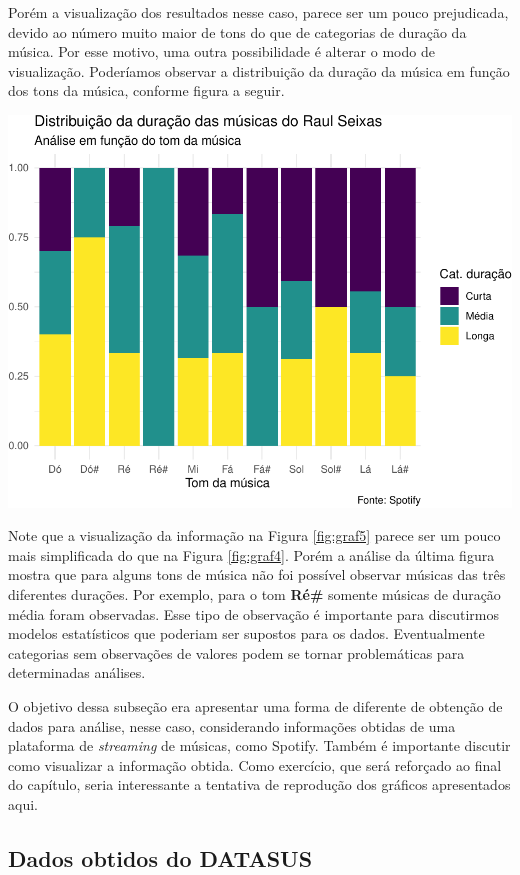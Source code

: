 \documentclass[]{book}
\begin{document}
Porém a visualização dos resultados nesse caso, parece ser um pouco prejudicada, devido ao número muito maior de tons do que de categorias de duração da música. Por esse motivo, uma outra possibilidade é alterar o modo de visualização. Poderíamos observar a distribuição da duração da música em função dos tons da música, conforme figura a seguir.

\begin{center}\includegraphics[width=0.8\linewidth]{notas_livro_files/figure-latex/graf5-1} \end{center}

Note que a visualização da informação na Figura \ref{fig:graf5} parece ser um pouco mais simplificada do que na Figura \ref{fig:graf4}. Porém a análise da última figura mostra que para alguns tons de música não foi possível observar músicas das três diferentes durações. Por exemplo, para o tom \textbf{Ré\#} somente músicas de duração média foram observadas. Esse tipo de observação é importante para discutirmos modelos estatísticos que poderiam ser supostos para os dados. Eventualmente categorias sem observações de valores podem se tornar problemáticas para determinadas análises.

O objetivo dessa subseção era apresentar uma forma de diferente de obtenção de dados para análise, nesse caso, considerando informações obtidas de uma plataforma de \emph{streaming} de músicas, como Spotify. Também é importante discutir como visualizar a informação obtida. Como exercício, que será reforçado ao final do capítulo, seria interessante a tentativa de reprodução dos gráficos apresentados aqui.

\hypertarget{dados-obtidos-do-datasus}{%
\subsection{Dados obtidos do DATASUS}\label{dados-obtidos-do-datasus}}
\end{document}
